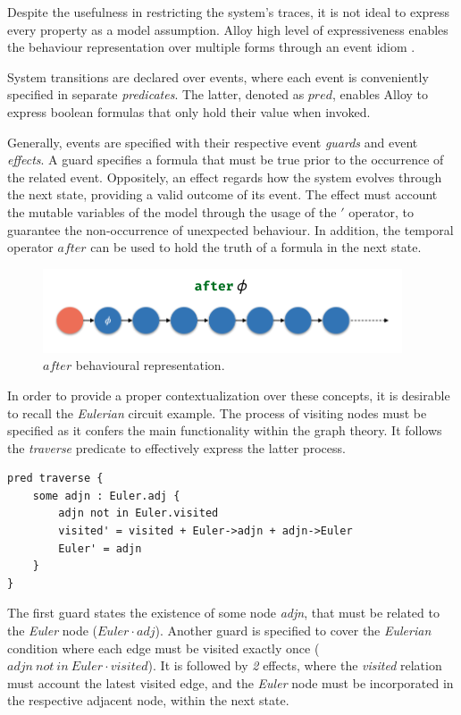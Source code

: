 Despite the usefulness in restricting the system's traces, it is not ideal to express every property as a model assumption. Alloy high level of expressiveness enables the behaviour representation over multiple forms through an event idiom \cite{lwspecification}.

System transitions are declared over events, where each event is conveniently specified in separate \textit{predicates}. The latter, denoted as $pred$, enables Alloy to express boolean formulas that only hold their value when invoked. 

Generally, events are specified with their respective event \textit{guards} and event \textit{effects}. A guard specifies a formula that must be true prior to the occurrence of the related event. Oppositely, an effect regards how the system evolves through the next state, providing a valid outcome of its event. The effect must account the mutable variables of the model through the usage of the $'$ operator, to guarantee the non-occurrence of unexpected behaviour. In addition, the temporal operator $after$ can be used to hold the truth of a formula in the next state.

\begin{figure}[H]
    \centering
    \includegraphics[width=0.6\linewidth]{img/alloy_after.png}
    \caption{$after$ behavioural representation.}
    \label{fig:alloy-after}
\end{figure}

In order to provide a proper contextualization over these concepts, it is desirable to recall the \textit{Eulerian} circuit example. The process of visiting nodes must be specified as it confers the main functionality within the graph theory. It follows the \textit{traverse} predicate to effectively express the latter process. 

\begin{lstlisting}[title={\textit{Eulerian} visiting event.}, otherkeywords = {pred, some, \:, \., not, in, ', \=, \+, \-\>}, floatplacement=H]
pred traverse {
    some adjn : Euler.adj {
        adjn not in Euler.visited
        visited' = visited + Euler->adjn + adjn->Euler
        Euler' = adjn
    }
}
\end{lstlisting}

The first guard states the existence of some node \textit{adjn}, that must be related to the \textit{Euler} node ($Euler \cdot adj$). Another guard is specified to cover the \textit{Eulerian} condition where each edge must be visited exactly once ($adjn\ not\ in\ Euler \cdot visited$). It is followed by \textit{2} effects, where the \textit{visited} relation must account the latest visited edge, and the \textit{Euler} node must be incorporated in the respective adjacent node, within the next state.

